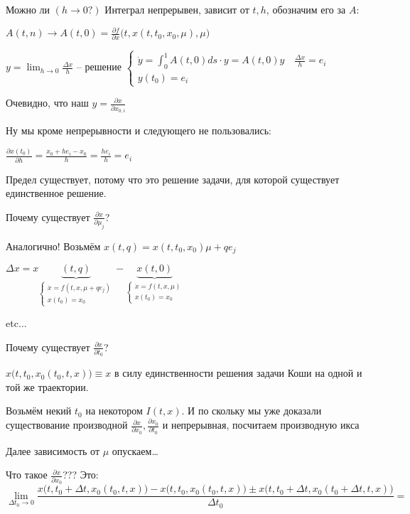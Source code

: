 \documentclass[12pt, a4paper]{article}
\begin{document}
  Можно ли $(h \to 0 ?)$
  Интеграл непрерывен, зависит от $t,h$, обозначим его за $A$:

  $A(t, n) \longrightarrow A(t, 0) = \frac{\partial f}{\partial x} \big( t, x(t, t_0, x_0, \mu), \mu\big)$

  $y = \lim_{h \to 0} \frac{\Delta x}{h}$  -- решение $\begin{cases}
    \dot y = \int^1_0 A(t, 0)ds\cdot y = A(t, 0)y \quad \frac{\Delta x}{h} = e_i\\ y(t_0) = e_i
  \end{cases} $

  Очевидно, что наш $y = \frac{\partial x}{\partial x_{0, i}}$

  Ну мы кроме непрерывности и следующего не пользовались:

  $\frac{\partial x(t_0)}{\partial h}= \frac{x_0 + he_i - x_0}{h} = \frac{he_i}{h} = e_i$ 

  Предел существует, потому что это решение задачи, для которой существует единственное решение.

  Почему существует $\frac{\partial x}{\partial \mu_j}$?

  Аналогично! Возьмём $x(t,q) = x(t, t_0, x_0)\mu + qe_j$

  $\Delta x = x\underbrace{(t,q)}_{\begin{cases}
    \dot x = f(t, x, \mu + qe_j)\\x(t_0) = x_0
  \end{cases}
} - \underbrace{x(t,0)}_{\begin{cases}
    \dot x = f(t, x, \mu) \\ x(t_0) = x_0
  \end{cases}}$

  etc...

  Почему существует $\frac{\partial x}{\partial t_0}$?

  $x\big(t, t_0, x_0(t_0, t, x)\big) \equiv x$ в силу единственности решения задачи Коши на одной и той же траектории.

  Возьмём некий $t_0$ на некотором $I(t, x)$. И по скольку мы уже доказали существование производной $\frac{\partial x}{\partial x_0}, \frac{\partial x_0}{\partial t_0}$ и непрерывная, посчитаем производную икса 

  Далее зависимость от $\mu$ опускаем\dots

  Что такое $\frac{\partial x}{\partial x_0}$??? Это: $$\lim_{\Delta t_0 \to 0} \frac{x\big(t, t_0 + \Delta t, x_0(t_0, t, x)\big) - x\big(t, t_0, x_0(t_0, t, x)\big) \pm x\big(t, t_0 + \Delta t, x_0(t_0 + \Delta t, t,x)\big) }{\Delta t_0} =$$
\end{document}
